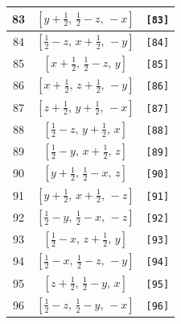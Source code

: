 \documentclass[fleqn,8pt]{jsarticle}
\begin{document}
\begin{longtable}{ccc}
83 & $\left[ y + \frac{1}{2},\, \frac{1}{2} - z,\, - x \right]$ & {\tt [83]} \\ \hline
84 & $\left[ \frac{1}{2} - z,\, x + \frac{1}{2},\, - y \right]$ & {\tt [84]} \\ \hline
85 & $\left[ x + \frac{1}{2},\, \frac{1}{2} - z,\, y \right]$ & {\tt [85]} \\ \hline
86 & $\left[ x + \frac{1}{2},\, z + \frac{1}{2},\, - y \right]$ & {\tt [86]} \\ \hline
87 & $\left[ z + \frac{1}{2},\, y + \frac{1}{2},\, - x \right]$ & {\tt [87]} \\ \hline
88 & $\left[ \frac{1}{2} - z,\, y + \frac{1}{2},\, x \right]$ & {\tt [88]} \\ \hline
89 & $\left[ \frac{1}{2} - y,\, x + \frac{1}{2},\, z \right]$ & {\tt [89]} \\ \hline
90 & $\left[ y + \frac{1}{2},\, \frac{1}{2} - x,\, z \right]$ & {\tt [90]} \\ \hline
91 & $\left[ y + \frac{1}{2},\, x + \frac{1}{2},\, - z \right]$ & {\tt [91]} \\ \hline
92 & $\left[ \frac{1}{2} - y,\, \frac{1}{2} - x,\, - z \right]$ & {\tt [92]} \\ \hline
93 & $\left[ \frac{1}{2} - x,\, z + \frac{1}{2},\, y \right]$ & {\tt [93]} \\ \hline
94 & $\left[ \frac{1}{2} - x,\, \frac{1}{2} - z,\, - y \right]$ & {\tt [94]} \\ \hline
95 & $\left[ z + \frac{1}{2},\, \frac{1}{2} - y,\, x \right]$ & {\tt [95]} \\ \hline
96 & $\left[ \frac{1}{2} - z,\, \frac{1}{2} - y,\, - x \right]$ & {\tt [96]} \\
\end{longtable}
\end{document}
